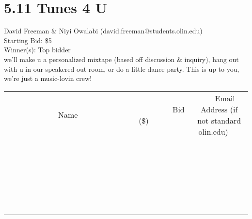 \documentclass[11pt]{article}
\begin{document}
\section*{5.11 Tunes 4 U}
David Freeman \& Niyi Owalabi (david.freeman@students.olin.edu) \\
Starting Bid: \$5 \\
Winner(s): 
Top bidder \\
we'll make u a personalized mixtape (based off discussion \& inquiry), hang out with u in our speakered-out room, or do a little dance party. This is up to you, we're just a music-lovin crew! \\[6ex]
\begin{tabular}{c c c}
~~~~~~~~~~~~~Name~~~~~~~~~~~~~ & ~~~~~~~~~Bid (\$)~~~~~~~~~ & ~~~Email Address (if not standard olin.edu)~~~ \\
 & & \\
\hline
 & & \\
\hline
 & & \\
\hline
 & & \\
\hline
 & & \\
\hline
 & & \\
\hline
 & & \\
\hline
 & & \\
\hline
 & & \\
\hline
 & & \\
\hline
 & & \\
\hline
 & & \\
\hline
 & & \\
\hline
 & & \\
\hline
 & & \\
\hline
 & & \\
\hline
 & & \\
\hline
 & & \\
\hline
 & & \\
\hline
 & & \\
\hline
 & & \\
\hline
 & & \\
\hline
 & & \\
\hline
 & & \\
\hline
 & & \\
\hline
 & & \\
\hline
\end{tabular}
\clearpage
\end{document}

